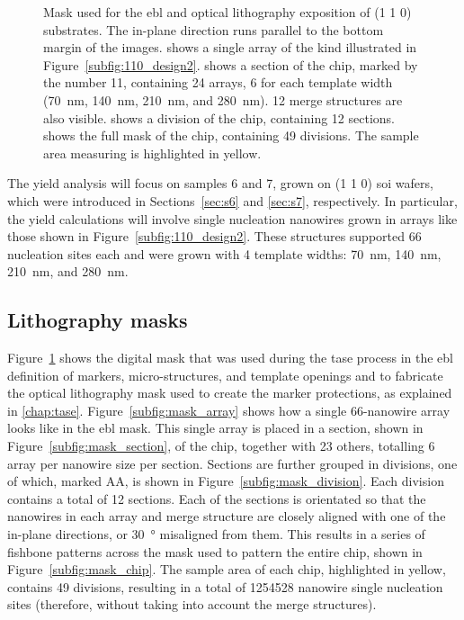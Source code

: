 \begin{figure}
{    }
    \caption[Mask used for the \acs{ebl} and optical lithography exposition of \hkl(1 1 0) substrtates.]{Mask used for the \acs{ebl} and optical lithography exposition of \hkl(1 1 0) substrates. The in-plane  direction runs parallel to the bottom margin of the images.  shows a single array of the kind illustrated in Figure~\ref{subfig:110_design2}.  shows a section of the chip, marked by the number 11, containing \num{24} arrays, \num{6} for each template width (\qty{70}{nm}, \qty{140}{nm}, \qty{210}{nm}, and \qty{280}{nm}). \num{12} merge structures are also visible.  shows a division of the chip, containing \num{12} sections.  shows the full mask of the chip, containing \num{49} divisions. The sample area measuring  is highlighted in yellow.}
    \label{fig:wafer_mask}
\end{figure}

The yield analysis will focus on samples \num{6} and \num{7}, grown on \hkl(1 1 0) \acs{soi} wafers, which were introduced in Sections~\ref{sec:s6} and \ref{sec:s7}, respectively. In particular, the yield calculations will involve single nucleation nanowires grown in arrays like those shown in Figure~\ref{subfig:110_design2}. These structures supported \num{66} nucleation sites each and were grown with 4 template widths: \qty{70}{nm}, \qty{140}{nm}, \qty{210}{nm}, and \qty{280}{nm}.

\subsection{Lithography masks}

Figure~\ref{fig:wafer_mask} shows the digital mask that was used during the \acs{tase} process in the \acf{ebl} definition of markers, micro-structures, and template openings and to fabricate the optical lithography mask used to create the marker protections, as explained in \ref{chap:tase}. Figure~\ref{subfig:mask_array} shows how a single \num{66}-nanowire array looks like in the \acs{ebl} mask. This single array is placed in a section, shown in Figure~\ref{subfig:mask_section}, of the chip, together with \num{23} others, totalling \num{6} array per nanowire size per section. Sections are further grouped in divisions, one of which, marked AA, is shown in Figure~\ref{subfig:mask_division}. Each division contains a total of \num{12} sections. Each of the sections is orientated so that the nanowires in each array and merge structure are closely aligned with one of the in-plane  directions, or \qty{30}{\degree} misaligned from them. This results in a series of fishbone patterns across the mask used to pattern the entire chip, shown in Figure~\ref{subfig:mask_chip}. The  sample area of each chip, highlighted in yellow, contains \num{49} divisions, resulting in a total of \num{1254528} nanowire single nucleation sites (therefore, without taking into account the merge structures). 

